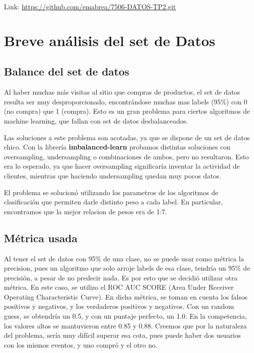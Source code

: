 \documentclass[a4paper ,12pt]{article}
\begin{document}
Link: \url{https://github.com/emabrea/7506-DATOS-TP2.git}

\newpage
\section{Breve análisis del set de Datos}
\subsection{Balance del set de datos}
Al haber muchas más visitas al sitio que compras de productos, el set de datos resulta ser muy desproporcionado, encontrándose muchas mas labels (95\%) con 0 (no compra) que 1 (compra). Esto es un gran problema para ciertos algoritmos de machine learning, que fallan con set de datos desbalanceados. 

Las soluciones a este problema son acotadas, ya que se dispone de un set de datos chico. Con la librería \textbf{imbalanced-learn} probamos distintas soluciones con oversampling, undersampling o combinaciones de ambos, pero no resultaron. 
Esto era lo esperado, ya que hacer oversampling significaría inventar la actividad de clientes, mientras que haciendo undersampling quedan muy pocos datos.

El problema se solucionó utilizando los parametros de los algoritmos de clasificación que permiten darle distinto peso a cada label. En particular, encontramos que la mejor relacion de pesos era de 1:7.

\subsection{Métrica usada}

Al tener el set de datos con 95\% de una clase, no se puede usar como métrica la precision, pues un algoritmo que solo arroje labels de esa clase, tendría un 95\% de precisión, a pesar de no predecir nada. Es por esto que se decidió utilizar otra métrica. En este caso, se utilizo el ROC AUC SCORE (Area Under Receiver Operating Characteristic Curve). En dicha métrica, se toman en cuenta los falsos positivos y negativos, y los verdaderos positivos y negativos. Con un random guess, se obtendría un 0.5, y con un puntaje perfecto, un 1.0. 
En la competencia, los valores altos se mantuvieron entre 0.85 y 0.88. Creemos que por la naturaleza del problema, sería muy difícil superar esa cota, pues puede haber dos usuarios con los mismos eventos, y uno compró y el otro no. 
\end{document}
